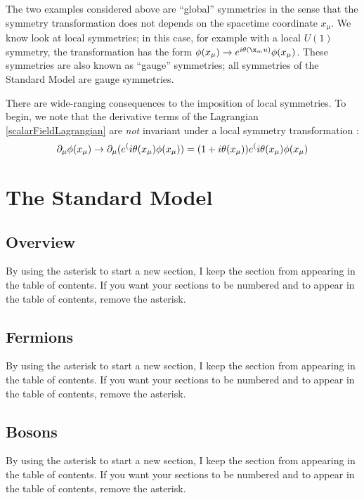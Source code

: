 The two examples considered above are ``global'' symmetries in the sense that the symmetry transformation does not depends on the spacetime coordinate $x_\mu$.
We know look at local symmetries; in this case, for example with a local $U(1)$ symmetry,  the transformation has the form $\phi(x_\mu) \rightarrow e^{i \theta(\x_mu)}\phi(x_\mu)$.
These symmetries are also known as ``gauge'' symmetries; all symmetries of the Standard Model are gauge symmetries.

There are wide-ranging consequences to the imposition of local symmetries.
To begin, we note that the derivative terms of the Lagrangian \ref{scalarFieldLagrangian} are \textit{not} invariant under a local symmetry transformation :
\begin{equation}
\partial_\mu \phi(x_\mu) \rightarrow \partial_\mu ( e^(i\theta(x_\mu) \phi(x_\mu )) = (1 + i \theta(x_\mu) ) e^(i\theta(x_\mu) \phi(x_\mu )
\end{equation}

\section{The Standard Model}

\subsection{Overview}

By using the asterisk to start a new section, I keep the section from appearing in the table of contents.
If you want your sections to be numbered and to appear in the table of contents, remove the asterisk.


\subsection{Fermions}

By using the asterisk to start a new section, I keep the section from appearing in the table of contents.
If you want your sections to be numbered and to appear in the table of contents, remove the asterisk.

\subsection{Bosons}

By using the asterisk to start a new section, I keep the section from appearing in the table of contents.
If you want your sections to be numbered and to appear in the table of contents, remove the asterisk.

